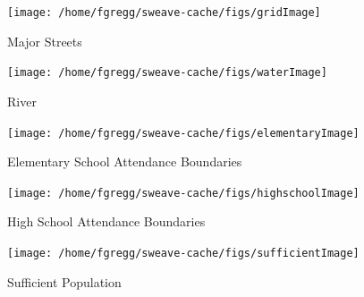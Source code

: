 \documentclass[12pt,letter]{article}\usepackage[]{graphicx}\usepackage[]{color}
\newenvironment{knitrout}{}{} %
\begin{document}
\begin{figure}
\begin{knitrout}
\color{fgcolor}

{\centering \texttt{[image: /home/fgregg/sweave-cache/figs/gridImage]} 

}



\end{knitrout}

\caption{Major Streets}
\end{figure}

\begin{figure}
\begin{knitrout}
\color{fgcolor}

{\centering \texttt{[image: /home/fgregg/sweave-cache/figs/waterImage]} 

}



\end{knitrout}

\caption{River}
\end{figure}

\begin{figure}
\begin{knitrout}
\color{fgcolor}

{\centering \texttt{[image: /home/fgregg/sweave-cache/figs/elementaryImage]} 

}



\end{knitrout}

\caption{Elementary School Attendance Boundaries}
\end{figure}

\begin{figure}
\begin{knitrout}
\color{fgcolor}

{\centering \texttt{[image: /home/fgregg/sweave-cache/figs/highschoolImage]} 

}



\end{knitrout}

\caption{High School Attendance Boundaries}
\end{figure}

\begin{figure}
\begin{knitrout}
\color{fgcolor}

{\centering \texttt{[image: /home/fgregg/sweave-cache/figs/sufficientImage]} 

}



\end{knitrout}

\caption{Sufficient Population}
\end{figure}
\end{document}
